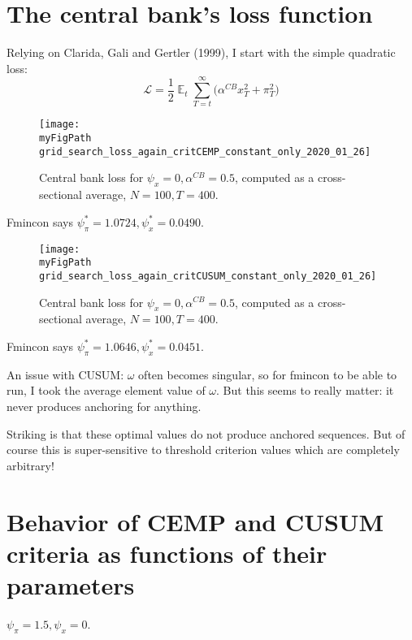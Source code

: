 \documentclass[11pt]{article}
\def \myFigPath {../figures/}
\renewcommand{\[}{\begin{equation}}
\renewcommand{\]}{\end{equation}}
\DeclareMathOperator{\E}{\mathbb{E}}
\def\mySmallerFigScale{0.18}
\begin{document}
\section{The central bank's loss function}
Relying on Clarida, Gali and Gertler (1999), I start with the simple quadratic loss:
\begin{equation}
\mathcal{L} = \frac{1}{2} \E_t\sum_{T=t}^{\infty} \bigg( \alpha^{CB} x_T^2 + \pi_T^2\bigg)
\end{equation}

\begin{figure}[h!]
\texttt{[image: \\myFigPath grid\_search\_loss\_again\_critCEMP\_constant\_only\_2020\_01\_26]}
\caption{Central bank loss for $\psi_x=0, \alpha^{CB} = 0.5$, computed as a cross-sectional average, $N=100, T=400$.}
\end{figure}

Fmincon says $\psi_{\pi}^* = 1.0724, \psi_x^* =    0.0490$.

\begin{figure}[h!]
\texttt{[image: \\myFigPath grid\_search\_loss\_again\_critCUSUM\_constant\_only\_2020\_01\_26]}
\caption{Central bank loss for $\psi_x=0, \alpha^{CB} = 0.5$, computed as a cross-sectional average, $N=100, T=400$.}
\end{figure}

Fmincon says $\psi_{\pi}^* = 1.0646, \psi_x^* =    0.0451$.
     
An issue with CUSUM: $\omega$ often becomes singular, so for fmincon to be able to run, I took the average element value of $\omega$. But this seems to really matter: it never produces anchoring for anything.

Striking is that these optimal values do not produce anchored sequences. But of course this is super-sensitive to threshold criterion values which are completely arbitrary!


\newpage
\section{Behavior of CEMP and CUSUM criteria as functions of their parameters}

$\psi_{\pi}=1.5, \psi_x = 0$.
\end{document}
